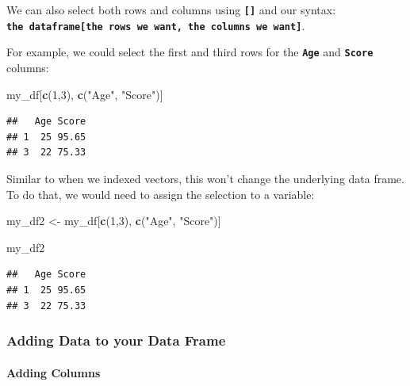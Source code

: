 \documentclass[
]{book}
\newenvironment{Shaded}{\begin{snugshade}}{\end{snugshade}}
\newcommand{\DecValTok}[1]{\textcolor[rgb]{0.00,0.00,0.81}{#1}}
\newcommand{\FunctionTok}[1]{\textcolor[rgb]{0.13,0.29,0.53}{\textbf{#1}}}
\newcommand{\NormalTok}[1]{#1}
\newcommand{\OtherTok}[1]{\textcolor[rgb]{0.56,0.35,0.01}{#1}}
\newcommand{\StringTok}[1]{\textcolor[rgb]{0.31,0.60,0.02}{#1}}
\begin{document}
We can also select both rows and columns using \textbf{\texttt{{[}{]}}} and our syntax: \textbf{\texttt{the\ dataframe{[}the\ rows\ we\ want,\ the\ columns\ we\ want{]}}}.

For example, we could select the first and third rows for the \textbf{\texttt{Age}} and \textbf{\texttt{Score}} columns:

\begin{Shaded}
\begin{Highlighting}[]
\NormalTok{my\_df[}\FunctionTok{c}\NormalTok{(}\DecValTok{1}\NormalTok{,}\DecValTok{3}\NormalTok{), }\FunctionTok{c}\NormalTok{(}\StringTok{"Age"}\NormalTok{, }\StringTok{"Score"}\NormalTok{)]}
\end{Highlighting}
\end{Shaded}

\begin{verbatim}
##   Age Score
## 1  25 95.65
## 3  22 75.33
\end{verbatim}

Similar to when we indexed vectors, this won't change the underlying data frame. To do that, we would need to assign the selection to a variable:

\begin{Shaded}
\begin{Highlighting}[]
\NormalTok{my\_df2 }\OtherTok{\textless{}{-}}\NormalTok{ my\_df[}\FunctionTok{c}\NormalTok{(}\DecValTok{1}\NormalTok{,}\DecValTok{3}\NormalTok{), }\FunctionTok{c}\NormalTok{(}\StringTok{"Age"}\NormalTok{, }\StringTok{"Score"}\NormalTok{)]}

\NormalTok{my\_df2}
\end{Highlighting}
\end{Shaded}

\begin{verbatim}
##   Age Score
## 1  25 95.65
## 3  22 75.33
\end{verbatim}

\hypertarget{adding-data-to-your-data-frame}{%
\subsubsection{Adding Data to your Data Frame}\label{adding-data-to-your-data-frame}}

\hypertarget{adding-columns}{%
\paragraph{Adding Columns}\label{adding-columns}}
\end{document}
